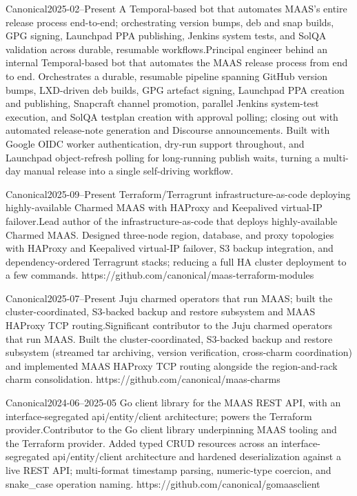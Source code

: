 {Canonical}{2025-02--Present}
{\iflean A Temporal-based bot that automates MAAS's entire release process end-to-end; orchestrating version bumps, deb and snap builds, GPG signing, Launchpad PPA publishing, Jenkins system tests, and SolQA validation across durable, resumable workflows.\else Principal engineer behind an internal Temporal-based bot that automates the MAAS release process from end to end. Orchestrates a durable, resumable pipeline spanning GitHub version bumps, LXD-driven deb builds, GPG artefact signing, Launchpad PPA creation and publishing, Snapcraft channel promotion, parallel Jenkins system-test execution, and SolQA testplan creation with approval polling; closing out with automated release-note generation and Discourse announcements. Built with Google OIDC worker authentication, dry-run support throughout, and Launchpad object-refresh polling for long-running publish waits, turning a multi-day manual release into a single self-driving workflow.\fi}
{}

{Canonical}{2025-09--Present}
{\iflean Terraform/Terragrunt infrastructure-as-code deploying highly-available Charmed MAAS with HAProxy and Keepalived virtual-IP failover.\else Lead author of the infrastructure-as-code that deploys highly-available Charmed MAAS. Designed three-node region, database, and proxy topologies with HAProxy and Keepalived virtual-IP failover, S3 backup integration, and dependency-ordered Terragrunt stacks; reducing a full HA cluster deployment to a few commands.\fi}
{https://github.com/canonical/maas-terraform-modules}

{Canonical}{2025-07--Present}
{\iflean Juju charmed operators that run MAAS; built the cluster-coordinated, S3-backed backup and restore subsystem and MAAS HAProxy TCP routing.\else Significant contributor to the Juju charmed operators that run MAAS. Built the cluster-coordinated, S3-backed backup and restore subsystem (streamed tar archiving, version verification, cross-charm coordination) and implemented MAAS HAProxy TCP routing alongside the region-and-rack charm consolidation.\fi}
{https://github.com/canonical/maas-charms}

{Canonical}{2024-06--2025-05}
{\iflean Go client library for the MAAS REST API, with an interface-segregated api/entity/client architecture; powers the Terraform provider.\else Contributor to the Go client library underpinning MAAS tooling and the Terraform provider. Added typed CRUD resources across an interface-segregated api/entity/client architecture and hardened deserialization against a live REST API; multi-format timestamp parsing, numeric-type coercion, and snake\_case operation naming.\fi}
{https://github.com/canonical/gomaasclient}


